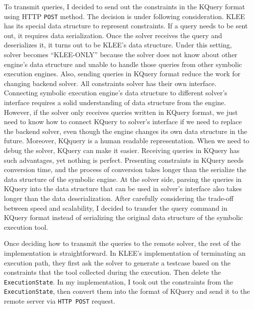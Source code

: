 To transmit queries, I decided to send out the constraints in the KQuery format using HTTP \texttt{POST} method. The decision is under following consideration. KLEE has its special data structure to represent constraints. If a query needs to be sent out, it requires data serialization. Once the solver receives the query and deserializes it, it turns out to be KLEE's data structure. Under this setting, solver becomes ``KLEE-ONLY'' because the solver does not know about other engine's data structure and unable to handle those queries from other symbolic execution engines. Also, sending queries in KQuery format reduce the work for changing backend solver. All constraints solver has their own interface. Connecting symbolic execution engine's  data structure to different solver's interface requires a solid understanding of data structure from the engine. However, if the solver only receives queries written in KQuery format, we just need to know how to connect KQuery to solver's interface if we need to replace the backend solver, even though the engine changes its own data structure in the future. Moreover, KQquery is a human readable representation. When we need to debug the solver, KQuery can make it easier. Receiving queries in KQuery has such advantages, yet nothing is perfect. Presenting constraints in KQuery needs conversion time, and the process of conversion takes longer than the serialize the data structure of the symbolic engine. At the solver side, parsing the queries in KQuery into the data structure that can be used in solver's interface also takes longer than the data deserialization. After carefully considering the trade-off between speed and scalability, I decided to transfer the query command in KQuery format instead of serializing the original data structure of the symbolic execution tool.

Once deciding how to transmit the queries to the remote solver, the rest of the implementation is straightforward. In KLEE's implementation of terminating an execution path, they first ask the solver to generate a testcase based on the constraints that the tool collected during the execution. Then delete the \texttt{ExecutionState}. In my implementation, I took out the constraints from the \texttt{ExecutionState}, then convert them into the format of KQuery and send it to the remote server via \texttt{HTTP POST} request.



